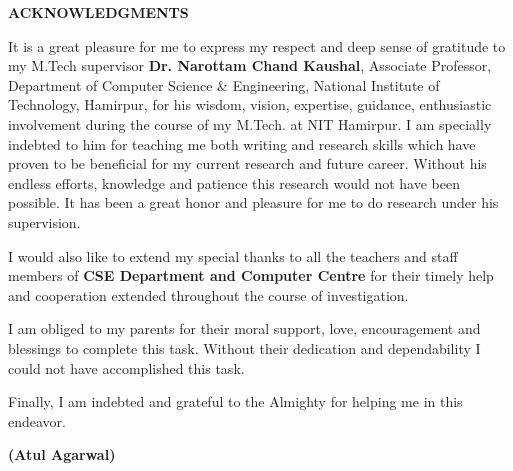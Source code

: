 \vspace{4.0\baselineskip}
\textbf{\hspace{2.5cm} \LARGE \textbf{ACKNOWLEDGMENTS}}

\vspace{15mm}
It is a great pleasure for me to express my respect and deep sense of gratitude to my M.Tech supervisor \textbf{Dr. Narottam Chand Kaushal}, Associate Professor, Department of Computer Science \& Engineering, National Institute of Technology, Hamirpur, for his wisdom, vision, expertise, guidance, enthusiastic involvement during the course of my M.Tech. at NIT Hamirpur. I am specially indebted to him for teaching me both writing and research skills which have proven to be beneficial for my current research and future career. Without his endless efforts, knowledge and patience this research would not have been possible. It has been a great honor and pleasure for me to do research under his supervision.\\
\par I would also like to extend my special thanks to all the teachers and staff members of \textbf{CSE Department and Computer Centre} for their timely help and cooperation extended throughout the course of investigation.\\

\par I am obliged to my parents for their moral support, love, encouragement and blessings to complete this task. Without their dedication and dependability I could not have accomplished this task.\\


\par Finally, I am indebted and grateful to the Almighty for helping me in this endeavor.\


\vspace{1.2cm}
\begin{flushright}
	\textbf{(Atul Agarwal)}
\end{flushright}

